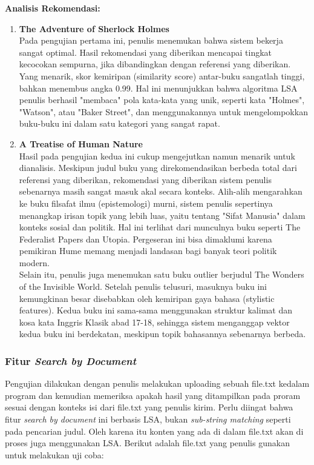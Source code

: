 \documentclass[12pt,a4paper]{article}
\begin{document}
\textbf{Analisis Rekomendasi:}
\begin{enumerate}
\item \textbf{The Adventure of Sherlock Holmes} \\
    Pada pengujian pertama ini, penulis menemukan bahwa sistem bekerja sangat optimal. Hasil rekomendasi yang diberikan mencapai tingkat kecocokan sempurna, jika dibandingkan dengan referensi yang diberikan. Yang menarik, skor kemiripan (similarity score) antar-buku sangatlah tinggi, bahkan menembus angka 0.99. Hal ini menunjukkan bahwa algoritma LSA penulis berhasil "membaca" pola kata-kata yang unik, seperti kata "Holmes", "Watson", atau "Baker Street", dan menggunakannya untuk mengelompokkan buku-buku ini dalam satu kategori yang sangat rapat.

    \item \textbf{A Treatise of Human Nature} \\
    Hasil pada pengujian kedua ini cukup mengejutkan namun menarik untuk dianalisis. Meskipun judul buku yang direkomendasikan berbeda total dari referensi yang diberikan, rekomendasi yang diberikan sistem penulis sebenarnya masih sangat masuk akal secara konteks. Alih-alih mengarahkan ke buku filsafat ilmu (epistemologi) murni, sistem penulis sepertinya menangkap irisan topik yang lebih luas, yaitu tentang "Sifat Manusia" dalam konteks sosial dan politik. Hal ini terlihat dari munculnya buku seperti The Federalist Papers dan Utopia. Pergeseran ini bisa dimaklumi karena pemikiran Hume memang menjadi landasan bagi banyak teori politik modern. \\

    Selain itu, penulis juga menemukan satu buku outlier berjudul The Wonders of the Invisible World. Setelah penulis telusuri, masuknya buku ini kemungkinan besar disebabkan oleh kemiripan gaya bahasa (stylistic features). Kedua buku ini sama-sama menggunakan struktur kalimat dan kosa kata Inggris Klasik abad 17-18, sehingga sistem menganggap vektor kedua buku ini berdekatan, meskipun topik bahasannya sebenarnya berbeda.
\end{enumerate}

\subsubsection{Fitur \textit{Search by Document}}
Pengujian dilakukan dengan penulis melakukan uploading sebuah file.txt kedalam program dan kemudian memeriksa apakah hasil yang ditampilkan pada proram sesuai dengan konteks isi dari file.txt yang penulis kirim. Perlu diingat bahwa fitur \textit{search by document} ini berbasis LSA, bukan \textit{sub-string matching} seperti pada pencarian judul. Oleh karena itu konten yang ada di dalam file.txt akan di proses juga menggunakan LSA. Berikut adalah file.txt yang penulis gunakan untuk melakukan uji coba:
\end{document}
